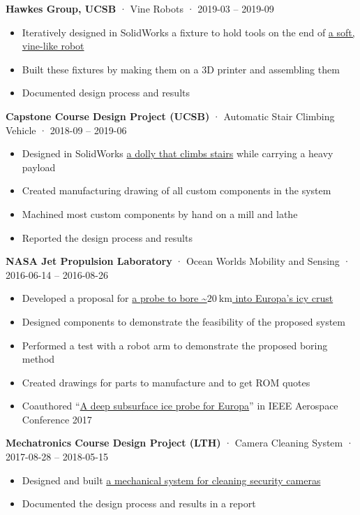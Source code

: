 \documentclass[12pt, oneside]{article}
\newcommand{\jobtitle}[3] {
	{\bf #1} · {#2} · {#3} \vspace{-7pt} \\
}
\begin{document}
\begin{flushleft}
\jobtitle{Hawkes Group, UCSB}{Vine Robots}{2019-03 – 2019-09}
\begin{itemize}
	\item Iteratively designed in SolidWorks a fixture to hold tools on the end of \href{https://portfolium.com/entry/vine-robot-tool-mount}{a soft, vine-like robot}
	\item Built these fixtures by making them on a 3D printer and assembling them 
	\item Documented design process and results
\end{itemize}

\jobtitle{Capstone Course Design Project (UCSB)}{Automatic Stair Climbing Vehicle}{2018-09 – 2019-06}
\begin{itemize}
	\item Designed in SolidWorks \href{https://portfolium.com/entry/automatic-stair-climbing-vehicle}{a dolly that climbs stairs} while carrying a heavy payload
	\item Created manufacturing drawing of all custom components in the system
	\item Machined most custom components by hand on a mill and lathe
	\item Reported the design process and results
\end{itemize}

\jobtitle{NASA Jet Propulsion Laboratory}{Ocean Worlds Mobility and Sensing}{2016-06-14 – 2016-08-26}
\begin{itemize}
	\item Developed a proposal for \href{https://portfolium.com/entry/owms-deep-subsurface-access-level-wind}{a probe to bore \textasciitilde$\SI{20}{\kilo\meter}$ into Europa's icy crust}
	\item Designed components to demonstrate the feasibility of the proposed system
	\item Performed a test with a robot arm to demonstrate the proposed boring method
	\item Created drawings for parts to manufacture and to get ROM quotes
	\item Coauthored ``\href{https://ieeexplore-ieee-org.proxy.library.ucsb.edu:9443/stamp/stamp.jsp?tp=&arnumber=7943863}{A deep subsurface ice probe for Europa}'' in IEEE Aerospace Conference 2017
\end{itemize}

\jobtitle{Mechatronics Course Design Project (LTH)}{Camera Cleaning System}{2017-08-28 – 2018-05-15}
\begin{itemize}
	\item Designed and built \href{https://portfolium.com/entry/automatic-security-camera-lens-cleaner}{a mechanical system for cleaning security cameras}
	\item Documented the design process and results in a report
\end{itemize}


\end{flushleft}
\end{document}
